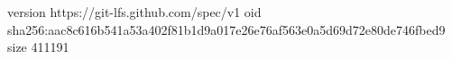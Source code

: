 version https://git-lfs.github.com/spec/v1
oid sha256:aac8c616b541a53a402f81b1d9a017e26e76af563e0a5d69d72e80de746fbed9
size 411191
